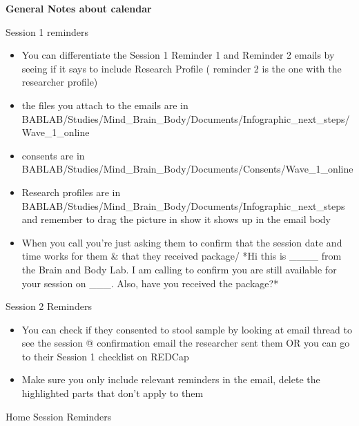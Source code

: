 \documentclass[
]{book}
\begin{document}
\textbf{General Notes about calendar}

Session 1 reminders

\begin{itemize}
\item
  You can differentiate the Session 1 Reminder 1 and Reminder 2 emails by seeing if it says to include Research Profile ( reminder 2 is the one with the researcher profile)
\item
  the files you attach to the emails are in BABLAB/Studies/Mind\_Brain\_Body/Documents/Infographic\_next\_steps/Wave\_1\_online
\item
  consents are in BABLAB/Studies/Mind\_Brain\_Body/Documents/Consents/Wave\_1\_online
\item
  Research profiles are in BABLAB/Studies/Mind\_Brain\_Body/Documents/Infographic\_next\_steps and remember to drag the picture in show it shows up in the email body
\item
  When you call you're just asking them to confirm that the session date and time works for them \& that they received package/ *Hi this is \_\_\_\_ from the Brain and Body Lab. I am calling to confirm you are still available for your session on \_\_\_. Also, have you received the package?*
\end{itemize}

Session 2 Reminders

\begin{itemize}
\item
  You can check if they consented to stool sample by looking at email thread to see the session @ confirmation email the researcher sent them OR you can go to their Session 1 checklist on REDCap
\item
  Make sure you only include relevant reminders in the email, delete the highlighted parts that don't apply to them
\end{itemize}

Home Session Reminders
\end{document}
